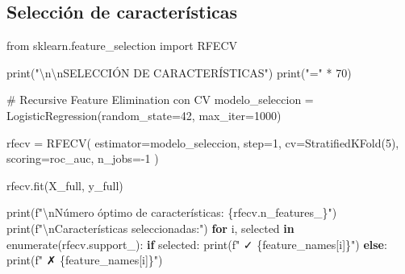 \documentclass[
  doc,
  floatsintext,
  longtable,
  a4paper,
  nolmodern,
  notxfonts,
  notimes,
  12pt,
  colorlinks=true,linkcolor=blue,citecolor=blue,urlcolor=blue]{apa7}
\newenvironment{Shaded}{\begin{snugshade}}{\end{snugshade}}
\newcommand{\BuiltInTok}[1]{\textcolor[rgb]{0.00,0.23,0.31}{#1}}
\newcommand{\CharTok}[1]{\textcolor[rgb]{0.13,0.47,0.30}{#1}}
\newcommand{\CommentTok}[1]{\textcolor[rgb]{0.37,0.37,0.37}{#1}}
\newcommand{\ControlFlowTok}[1]{\textcolor[rgb]{0.00,0.23,0.31}{\textbf{#1}}}
\newcommand{\DecValTok}[1]{\textcolor[rgb]{0.68,0.00,0.00}{#1}}
\newcommand{\ImportTok}[1]{\textcolor[rgb]{0.00,0.46,0.62}{#1}}
\newcommand{\KeywordTok}[1]{\textcolor[rgb]{0.00,0.23,0.31}{\textbf{#1}}}
\newcommand{\NormalTok}[1]{\textcolor[rgb]{0.00,0.23,0.31}{#1}}
\newcommand{\OperatorTok}[1]{\textcolor[rgb]{0.37,0.37,0.37}{#1}}
\newcommand{\SpecialCharTok}[1]{\textcolor[rgb]{0.37,0.37,0.37}{#1}}
\newcommand{\SpecialStringTok}[1]{\textcolor[rgb]{0.13,0.47,0.30}{#1}}
\newcommand{\StringTok}[1]{\textcolor[rgb]{0.13,0.47,0.30}{#1}}
\begin{document}
\subsection{Selección de
características}\label{selecciuxf3n-de-caracteruxedsticas}

\begin{Shaded}
\begin{Highlighting}[]
\ImportTok{from}\NormalTok{ sklearn.feature\_selection }\ImportTok{import}\NormalTok{ RFECV}

\BuiltInTok{print}\NormalTok{(}\StringTok{"}\CharTok{\textbackslash{}n\textbackslash{}n}\StringTok{SELECCIÓN DE CARACTERÍSTICAS"}\NormalTok{)}
\BuiltInTok{print}\NormalTok{(}\StringTok{"="} \OperatorTok{*} \DecValTok{70}\NormalTok{)}

\CommentTok{\# Recursive Feature Elimination con CV}
\NormalTok{modelo\_seleccion }\OperatorTok{=}\NormalTok{ LogisticRegression(random\_state}\OperatorTok{=}\DecValTok{42}\NormalTok{, max\_iter}\OperatorTok{=}\DecValTok{1000}\NormalTok{)}

\NormalTok{rfecv }\OperatorTok{=}\NormalTok{ RFECV(}
\NormalTok{    estimator}\OperatorTok{=}\NormalTok{modelo\_seleccion,}
\NormalTok{    step}\OperatorTok{=}\DecValTok{1}\NormalTok{,}
\NormalTok{    cv}\OperatorTok{=}\NormalTok{StratifiedKFold(}\DecValTok{5}\NormalTok{),}
\NormalTok{    scoring}\OperatorTok{=}\StringTok{\textquotesingle{}roc\_auc\textquotesingle{}}\NormalTok{,}
\NormalTok{    n\_jobs}\OperatorTok{={-}}\DecValTok{1}
\NormalTok{)}

\NormalTok{rfecv.fit(X\_full, y\_full)}

\BuiltInTok{print}\NormalTok{(}\SpecialStringTok{f"}\CharTok{\textbackslash{}n}\SpecialStringTok{Número óptimo de características: }\SpecialCharTok{\{}\NormalTok{rfecv}\SpecialCharTok{.}\NormalTok{n\_features\_}\SpecialCharTok{\}}\SpecialStringTok{"}\NormalTok{)}
\BuiltInTok{print}\NormalTok{(}\SpecialStringTok{f"}\CharTok{\textbackslash{}n}\SpecialStringTok{Características seleccionadas:"}\NormalTok{)}
\ControlFlowTok{for}\NormalTok{ i, selected }\KeywordTok{in} \BuiltInTok{enumerate}\NormalTok{(rfecv.support\_):}
    \ControlFlowTok{if}\NormalTok{ selected:}
        \BuiltInTok{print}\NormalTok{(}\SpecialStringTok{f"  ✓ }\SpecialCharTok{\{}\NormalTok{feature\_names[i]}\SpecialCharTok{\}}\SpecialStringTok{"}\NormalTok{)}
    \ControlFlowTok{else}\NormalTok{:}
        \BuiltInTok{print}\NormalTok{(}\SpecialStringTok{f"  ✗ }\SpecialCharTok{\{}\NormalTok{feature\_names[i]}\SpecialCharTok{\}}\SpecialStringTok{"}\NormalTok{)}


\end{Highlighting}
\end{Shaded}
\end{document}
